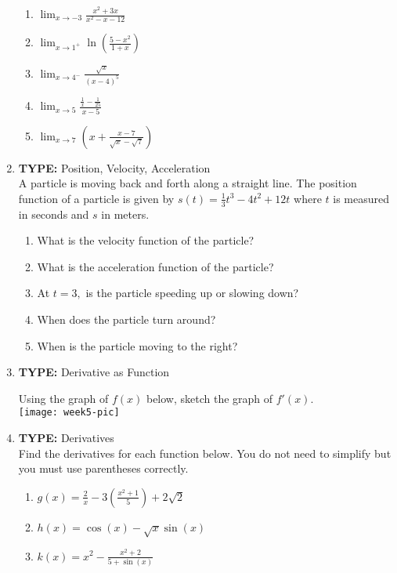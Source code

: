 \documentclass[11pt,fleqn]{article}
\begin{document}
\begin{enumerate}
\begin{enumerate}
	\item$\displaystyle{\lim_{x\to-3 }\frac{x^2+3x}{x^2-x-12}}$
	\vfill
	\item $\displaystyle{\lim_{x\to1^+} \ln\left(\frac{5-x^2}{1+x}\right) }$
	\vfill
	\item $\displaystyle{\lim_{x\to4^-}\frac{\sqrt{x}}{(x-4)^5} }$
	\vfill
	\item $\displaystyle{\lim_{x\to 5}\frac{\frac{1}{x}-\frac{1}{25}}{x-5}}$
	\vfill
	\item $\displaystyle{\lim_{x\to 7}\left(x+\frac{x-7}{\sqrt{x}-\sqrt{7}}\right)}$
	\vfill
\end{enumerate} 

\newpage
\item \textbf{TYPE:} Position, Velocity, Acceleration\\
A particle is moving back and forth along a straight line. The position function of a particle is given by $s(t)=\frac{1}{3}t^3-4t^2+12t$ where $t$ is measured in seconds and $s$ in meters.  
\begin{enumerate}
	\item What is the velocity function of the particle?
	\vfill
	\item What is the acceleration function of the particle?
	\vfill
	\item At $t=3,$ is the particle speeding up or slowing down?
	\vfill
	\item When does the particle turn around?
	\vfill
	\item When is the particle moving to the right?
	\vfill
\end{enumerate} 

\item \textbf{TYPE:} Derivative as Function
\begin{multicols}{2}
Using the graph of $f(x)$ below, sketch the graph of $f'(x).$\\
\texttt{[image: week5-pic]}
\end{multicols}
\newpage
\item \textbf{TYPE:} Derivatives\\
Find the derivatives for each function below. You do not need to simplify but you must use parentheses correctly.
\begin{enumerate}
	\item $g(x)=\frac{2}{x}-3\left(\frac{x^2+1}{5}\right)+2\sqrt{2}$
	\vfill
	\item $h(x)=\cos(x) - \sqrt{x} \sin(x)$
	\vfill
	\item $k(x)= x^2-\frac{x^2+2}{5+\sin(x)}$
	\vfill
\end{enumerate} 


\end{enumerate}
\end{document}
